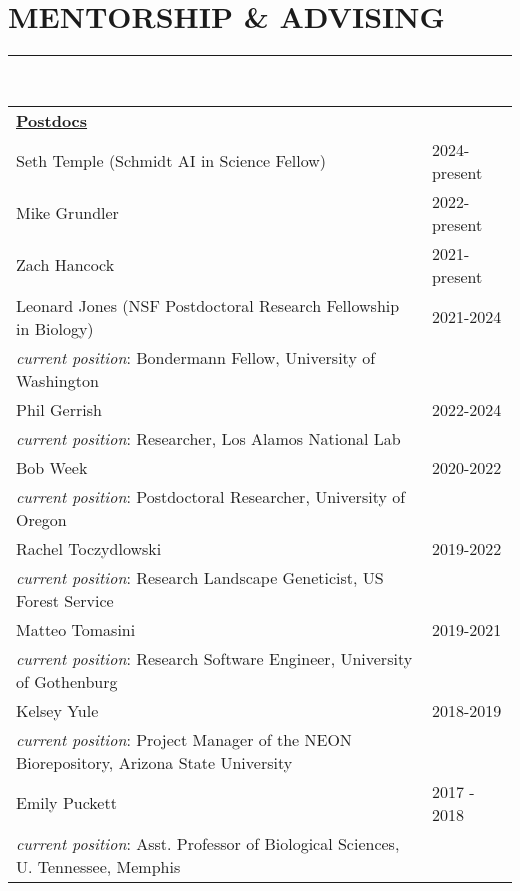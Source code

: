 \documentclass{gbcv}
\begin{document}
\section*{MENTORSHIP \& ADVISING}
\vspace{-0.6cm}
\rule{470pt}{0.4pt}
\hfill\\
\vspace{-0.9cm}
\begin{longtable}{>{\everypar{\hangindent1cm}}p{}p{}}
%
\textbf{\underline{Postdocs}}\\
\rule{0pt}{3ex}Seth Temple (Schmidt AI in Science Fellow) & \hfill 2024-present\\
Mike Grundler & \hfill 2022-present\\
Zach Hancock & \hfill 2021-present\\
Leonard Jones (NSF Postdoctoral Research Fellowship in Biology) & \hfill 2021-2024\\
\hspace{0.5cm} \textit{current position}: Bondermann Fellow, University of Washington \\
Phil Gerrish & \hfill 2022-2024\\
\hspace{0.5cm} \textit{current position}: Researcher, Los Alamos National Lab \\
Bob Week & \hfill 2020-2022\\
\hspace{0.5cm} \textit{current position}: Postdoctoral Researcher, University of Oregon \\
Rachel Toczydlowski & \hfill 2019-2022\\
\hspace{0.5cm} \textit{current position}: Research Landscape Geneticist, US Forest Service \\
Matteo Tomasini & \hfill 2019-2021\\
\hspace{0.5cm} \textit{current position}: Research Software Engineer, University of Gothenburg \\
Kelsey Yule & \hfill 2018-2019\\
\hspace{0.5cm} \textit{current position}: Project Manager of the NEON Biorepository, Arizona State University\\
Emily Puckett & \hfill 2017 - 2018\\
\hspace{0.5cm}\textit{current position}: Asst. Professor of Biological Sciences, U. Tennessee, Memphis\\

\end{longtable}
\end{document}
